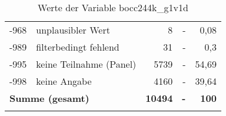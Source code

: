 \begin{longtable}{Xlrrr}
       -968 & unplausibler Wert & 8 & - & 0,08 \\

       -989 & filterbedingt fehlend & 31 & - & 0,3 \\

       -995 & keine Teilnahme (Panel) & 5739 & - & 54,69 \\

       -998 & keine Angabe & 4160 & - & 39,64 \\

     \midrule
     \multicolumn{2}{l}{\textbf{Summe (gesamt)}} & \textbf{10494} & \textbf{-} & \textbf{100} \\
     \bottomrule
     \caption{Werte der Variable bocc244k\_g1v1d}
     \end{longtable}
     
